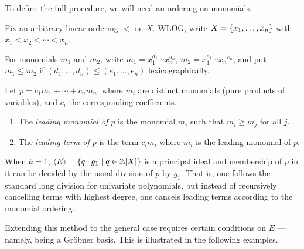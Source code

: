 \documentclass[numbers=enddot]{scrartcl}
\newcommand{\ints}{\mathbb{Z}}
\begin{document}
To define the full procedure, we will need an ordering on monomials.
\begin{dfn}
  Fix an arbitrary linear ordering $<$ on $X$. WLOG, write $X = \left\{x_1,\dots,x_n\right\}$ with 
  $x_1 < x_2 < \cdots < x_n$.

  For monomials $m_1$ and $m_2$, write $m_1 = x_1^{d_1}\cdots x_n^{d_n}$, $m_2 = x_1^{e_1} \cdots {x_n}^{e_n}$,
  and put $m_1 \le m_2$ if $(d_1,\dots,d_n) \le (e_1,\dots,e_n)$ lexicographically.
\end{dfn}

\begin{dfn}
  Let $p = c_1 m_1 + \cdots + c_n m_n$, where $m_i$ are distinct monomials (pure products of variables), 
  and $c_i$ the corresponding coefficients.
  \begin{enumerate}
    \item The \emph{leading monomial of $p$} is the monomial $m_i$ such that $m_i \ge m_j$ for all $j$.
    \item The \emph{leading term of $p$} is the term $c_i m_i$ where $m_i$ is the leading monomial of $p$.
  \end{enumerate}
\end{dfn}

When $k=1$, $\seqof{E} = \setof{q \cdot g_1 \mid q \in \ints[X]}$ is a principal ideal
and membership of $p$ in it can be decided by the usual division of $p$ by $g_1$.
That is, one follows the standard long division for univariate polynomials, but instead of 
recursively cancelling terms with highest degree, one cancels leading terms 
according to the monomial ordering.

Extending this method to the general case requires certain conditions on $E$ ---
namely, being a Gr\"obner basis.  This is illustrated in the following examples.
\end{document}
